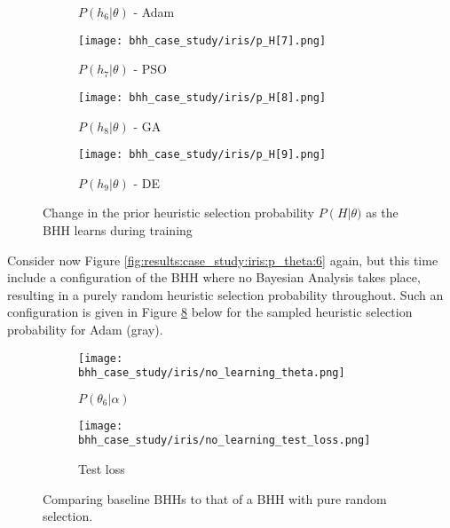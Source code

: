 \begin{figure}[htbp]
\begin{subfigure}{0.5\textwidth}
            \caption{$P\left(h_{6} | \theta \right)$ - \Acs{Adam}}
            \label{fig:results:case_study:iris:p_H:6}
      \end{subfigure}
      \begin{subfigure}{0.5\textwidth}
            \centering
            \texttt{[image: bhh\_case\_study/iris/p\_H[7].png]}
            \caption{$P\left(h_{7} | \theta \right)$ - \Acs{PSO}}
            \label{fig:results:case_study:iris:p_H:7}
      \end{subfigure}
      \par\medskip
      \begin{subfigure}{0.5\textwidth}
            \centering
            \texttt{[image: bhh\_case\_study/iris/p\_H[8].png]}
            \caption{$P\left(h_{8} | \theta \right)$ - \Acs{GA}}
            \label{fig:results:case_study:iris:p_H:8}
      \end{subfigure}
      \begin{subfigure}{0.5\textwidth}
            \centering
            \texttt{[image: bhh\_case\_study/iris/p\_H[9].png]}
            \caption{$P\left(h_{9} | \theta \right)$ - \Acs{DE}}
            \label{fig:results:case_study:iris:p_H:9}
      \end{subfigure}
      \par\medskip
      \caption{Change in the prior heuristic selection probability $P\left(H\right | \theta )$ as the \Ac{BHH} learns during training}
      \label{fig:results:case_study:iris:p_H}
\end{figure}


Consider now Figure \ref{fig:results:case_study:iris:p_theta:6} again, but this time include a configuration of the \Acs{BHH} where no Bayesian Analysis takes place, resulting in a purely random heuristic selection probability throughout. Such an configuration is given in Figure \ref{fig:results:case_study:iris:no_learn:metrics} below for the sampled heuristic selection probability for \Acs{Adam} (gray).

\begin{figure}[htbp]
      \begin{subfigure}{0.5\textwidth}
            \centering
            \texttt{[image: bhh\_case\_study/iris/no\_learning\_theta.png]}
            \caption{$P(\theta_{6} | \alpha)$}
            \label{fig:results:case_study:iris:no_learn:p_theta}
      \end{subfigure}
      \begin{subfigure}{0.5\textwidth}
            \centering
            \texttt{[image: bhh\_case\_study/iris/no\_learning\_test\_loss.png]}
            \caption{Test loss}
            \label{fig:results:case_study:iris:no_learn:test:loss}
      \end{subfigure}
      \par\bigskip
      \caption{Comparing baseline \Acp{BHH} to that of a \Ac{BHH} with pure random selection.}
      \label{fig:results:case_study:iris:no_learn:metrics}
\end{figure}

